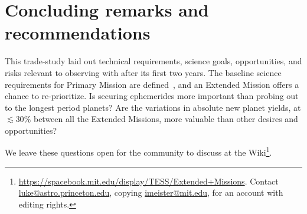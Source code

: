\section{Concluding remarks and recommendations}
\label{sec:conclusions}

This trade-study laid out technical requirements, science goals, opportunities, and risks relevant to observing with \tess after its first two years.
The baseline science requirements for \tesss Primary Mission are defined~\citep{ricker_transiting_2014}, and an Extended Mission offers a chance to re-prioritize.
Is securing \tesss ephemerides more important than probing out to the longest period planets? 
Are the variations in absolute new planet yields, at $\lesssim30\%$ between all the Extended Missions, more valuable than other desires and opportunities?

We leave these questions open for the community to discuss at the \tess Wiki\footnote{\url{https://spacebook.mit.edu/display/TESS/Extended+Missions}. Contact \url{luke@astro.princeton.edu}, copying \url{imeister@mit.edu}, for an account with editing rights.}.


